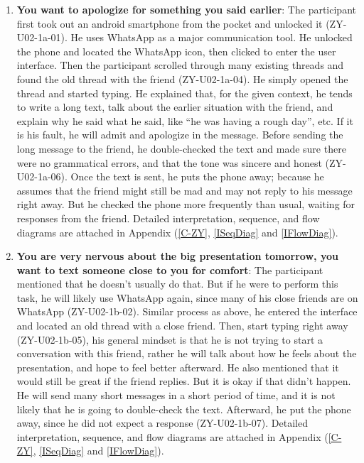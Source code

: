 \documentclass[acmsmall,screen,authorversion,nonacm]{acmart}
\begin{document}
\begin{center}
\begin{enumerate}
    \item \textbf{You want to apologize for something you said earlier}: The participant first took out an android smartphone from the pocket and unlocked it (ZY-U02-1a-01). He uses WhatsApp as a major communication tool. He unlocked the phone and located the WhatsApp icon, then clicked to enter the user interface. Then the participant scrolled through many existing threads and found the old thread with the friend (ZY-U02-1a-04). He simply opened the thread and started typing. He explained that, for the given context, he tends to write a long text, talk about the earlier situation with the friend, and explain why he said what he said, like “he was having a rough day”, etc. If it is his fault, he will admit and apologize in the message. Before sending the long message to the friend, he double-checked the text and made sure there were no grammatical errors, and that the tone was sincere and honest (ZY-U02-1a-06). Once the text is sent, he puts the phone away; because he assumes that the friend might still be mad and may not reply to his message right away. But he checked the phone more frequently than usual, waiting for responses from the friend. Detailed interpretation, sequence, and flow diagrams are attached in Appendix (\ref{C-ZY}, \ref{ISeqDiag} and \ref{IFlowDiag}). 
    
    \item \textbf{You are very nervous about the big presentation tomorrow, you want to text someone close to you for comfort}: The participant mentioned that he doesn’t usually do that. But if he were to perform this task, he will likely use WhatsApp again, since many of his close friends are on WhatsApp (ZY-U02-1b-02). Similar process as above, he entered the interface and located an old thread with a close friend. Then, start typing right away (ZY-U02-1b-05), his general mindset is that he is not trying to start a conversation with this friend, rather he will talk about how he feels about the presentation, and hope to feel better afterward. He also mentioned that it would still be great if the friend replies. But it is okay if that didn’t happen. He will send many short messages in a short period of time, and it is not likely that he is going to double-check the text. Afterward, he put the phone away, since he did not expect a response (ZY-U02-1b-07). Detailed interpretation, sequence, and flow diagrams are attached in Appendix (\ref{C-ZY}, \ref{ISeqDiag} and \ref{IFlowDiag}). 
    

\end{enumerate}
\end{center}
\end{document}
